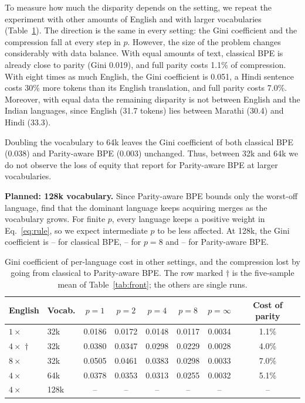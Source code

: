 To measure how much the disparity depends on the setting, we repeat the experiment with
other amounts of English and with larger vocabularies (Table~\ref{tab:sens}). The direction
is the same in every setting: the Gini coefficient and the compression fall at every step
in $p$. However, the size of the problem changes considerably with data balance. With equal
amounts of text, classical BPE is already close to parity (Gini 0.019), and full parity costs
1.1\% of compression. With eight times as much English, the Gini coefficient is 0.051, a
Hindi sentence costs 30\% more tokens than its English translation, and full parity costs
7.0\%. Moreover, with equal data the remaining disparity is not between English and the
Indian languages, since English (31.7 tokens) lies between Marathi (30.4) and Hindi (33.3).

Doubling the vocabulary to 64k leaves the Gini coefficient of both classical BPE (0.038) and
Parity-aware BPE (0.003) unchanged. Thus, between 32k and 64k we do not observe the loss of
equity that \citet{lee2026} report for Parity-aware BPE at larger vocabularies.

\noindent\textbf{Planned: 128k vocabulary.}
Since Parity-aware BPE bounds only the worst-off language, \citet{lee2026} find that the
dominant language keeps acquiring merges as the vocabulary grows. For finite $p$, every
language keeps a positive weight in Eq.~\eqref{eq:rule}, so we expect intermediate $p$ to
be less affected. At 128k, the Gini coefficient is -- for classical BPE, -- for $p=8$ and --
for Parity-aware BPE.

\begin{table}[t]
\centering
\small
\begin{tabular}{llcccccc}
\toprule
English & Vocab. & $p=1$ & $p=2$ & $p=4$ & $p=8$ & $p=\infty$ & Cost of parity\\
\midrule
$1\times$ & 32k & 0.0186 & 0.0172 & 0.0148 & 0.0117 & 0.0034 & 1.1\%\\
$4\times$ $\dagger$ & 32k & 0.0380 & 0.0347 & 0.0298 & 0.0229 & 0.0028 & 4.0\%\\
$8\times$ & 32k & 0.0505 & 0.0461 & 0.0383 & 0.0298 & 0.0033 & 7.0\%\\
$4\times$ & 64k & 0.0378 & 0.0353 & 0.0313 & 0.0255 & 0.0032 & 5.1\%\\
$4\times$ & 128k & -- & -- & -- & -- & -- & --\\
\bottomrule
\end{tabular}
\caption{Gini coefficient of per-language cost in other settings, and the compression lost
by going from classical to Parity-aware BPE. The row marked $\dagger$ is the five-sample mean
of Table~\ref{tab:front}; the others are single runs.}
\label{tab:sens}
\end{table}

